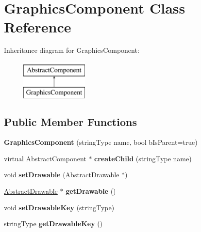 \hypertarget{classGraphicsComponent}{\section{Graphics\-Component Class Reference}
\label{classGraphicsComponent}
}
Inheritance diagram for Graphics\-Component\-:\begin{figure}[H]
\begin{center}
\leavevmode
\includegraphics[height=2.000000cm]{classGraphicsComponent}
\end{center}
\end{figure}
\subsection*{Public Member Functions}
\begin{DoxyCompactItemize}
\item 
\hypertarget{classGraphicsComponent_a86d6f28a92a1414c906116e66ab02a12}{{\bfseries Graphics\-Component} (string\-Type name, bool b\-Is\-Parent=true)}\label{classGraphicsComponent_a86d6f28a92a1414c906116e66ab02a12}

\item 
\hypertarget{classGraphicsComponent_aa30e4633b6cf6b33c054e6907be3f016}{virtual \hyperlink{classAbstractComponent}{Abstract\-Component} $\ast$ {\bfseries create\-Child} (string\-Type name)}\label{classGraphicsComponent_aa30e4633b6cf6b33c054e6907be3f016}

\item 
\hypertarget{classGraphicsComponent_abbb298b16da1b984d68ddf5819b9b91b}{void {\bfseries set\-Drawable} (\hyperlink{classAbstractDrawable}{Abstract\-Drawable} $\ast$)}\label{classGraphicsComponent_abbb298b16da1b984d68ddf5819b9b91b}

\item 
\hypertarget{classGraphicsComponent_a274bede10f488744d1305e5bb4fc3a8a}{\hyperlink{classAbstractDrawable}{Abstract\-Drawable} $\ast$ {\bfseries get\-Drawable} ()}\label{classGraphicsComponent_a274bede10f488744d1305e5bb4fc3a8a}

\item 
\hypertarget{classGraphicsComponent_af391a82c1b3dece82545bcb9a72df122}{void {\bfseries set\-Drawable\-Key} (string\-Type)}\label{classGraphicsComponent_af391a82c1b3dece82545bcb9a72df122}

\item 
\hypertarget{classGraphicsComponent_a26f2f44e541a45f69f101f5c7eea198e}{string\-Type {\bfseries get\-Drawable\-Key} ()}\label{classGraphicsComponent_a26f2f44e541a45f69f101f5c7eea198e}

\end{DoxyCompactItemize}
